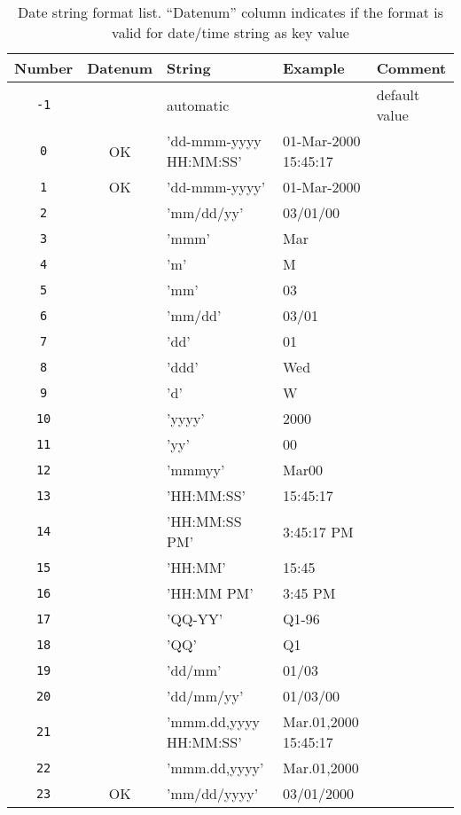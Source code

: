 \begin{table}[htp]
\caption{Date string format list. ``Datenum'' column indicates if the format is valid for date/time string as key value}
\label{datestr}
\begin{center}
\begin{tabular}{|c|c|l|l|l|}
\hline
\textbf{Number} & \textbf{Datenum} & \textbf{String} & \textbf{Example} & \textbf{Comment}\\
\hline
\texttt{-1}		&		& automatic					&	& default value\\
\texttt{0}		& OK	& 'dd-mmm-yyyy HH:MM:SS'	& 01-Mar-2000 15:45:17	&\\
\texttt{1}		& OK	& 'dd-mmm-yyyy'				& 01-Mar-2000	&\\
\texttt{2}		&		& 'mm/dd/yy'				& 03/01/00	&\\
\texttt{3}		&		& 'mmm'						& Mar	&\\
\texttt{4}		&		& 'm'						& M	&\\
\texttt{5}		&		& 'mm'						& 03	&\\
\texttt{6}		&		& 'mm/dd'					& 03/01	&\\
\texttt{7}		&		& 'dd'						& 01	&\\
\texttt{8}		&		& 'ddd'						& Wed	&\\
\texttt{9}		&		& 'd'						& W	&\\
\texttt{10}		&		& 'yyyy'					& 2000	&\\
\texttt{11}		&		& 'yy'						& 00	&\\
\texttt{12}		&		& 'mmmyy'					& Mar00	&\\
\texttt{13}		&		& 'HH:MM:SS'				& 15:45:17	&\\
\texttt{14}		&		& 'HH:MM:SS PM'				& 3:45:17 PM	&\\
\texttt{15}		&		& 'HH:MM'					& 15:45	&\\
\texttt{16}		&		& 'HH:MM PM'				& 3:45 PM	&\\
\texttt{17}		&		& 'QQ-YY'					& Q1-96	&\\
\texttt{18}		&		& 'QQ'						& Q1	&\\
\texttt{19}		&		& 'dd/mm'					& 01/03	&\\
\texttt{20}		&		& 'dd/mm/yy'				& 01/03/00	&\\
\texttt{21}		&		& 'mmm.dd,yyyy HH:MM:SS'	& Mar.01,2000 15:45:17	&\\
\texttt{22}		&		& 'mmm.dd,yyyy'				& Mar.01,2000	&\\
\texttt{23}		& OK	& 'mm/dd/yyyy'				& 03/01/2000	&\\

\end{tabular}
\end{center}
\end{table}
